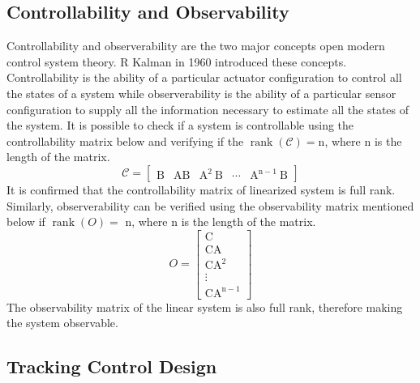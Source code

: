\documentclass{UoNMCHA}
\numberwithin{equation}{section}
\begin{document}
\subsection{Controllability and Observability}
Controllability and observerability are the two major concepts open modern control system theory. $\mathrm{R}$ Kalman in 1960 introduced these concepts. Controllability is the ability of a particular actuator
configuration to control all the states of a system while observerability is the ability of a particular
sensor configuration to supply all the information necessary to estimate all the states of the system. It
is possible to check if a system is controllable using the controllability matrix below and verifying if
the $\operatorname{rank}(\mathcal{C})=\mathrm{n}$, where $\mathrm{n}$ is the length of the matrix.
$$
\mathcal{C}=\left[\begin{array}{lllll}
\mathrm{B} & \mathrm{AB} & \mathrm{A}^{2} \mathrm{~B} & \cdots & \mathrm{A}^{\mathrm{n}-1} \mathrm{~B}
\end{array}\right]
$$
It is confirmed that the controllability matrix of linearized system is full rank.
Similarly, observerability can be verified using the observability matrix mentioned below if $\operatorname{rank}(O)=$
$\mathrm{n}$, where $\mathrm{n}$ is the length of the matrix.
$$
O=\left[\begin{array}{c}
\mathrm{C} \\
\mathrm{CA} \\
\mathrm{CA}^{2} \\
\vdots \\
\mathrm{CA}^{\mathrm{n}-1}
\end{array}\right]
$$
The observability matrix of the linear system is also full rank, therefore making the system observable.

\subsection{Tracking Control Design}\label{Tracking Control Design}
\end{document}
